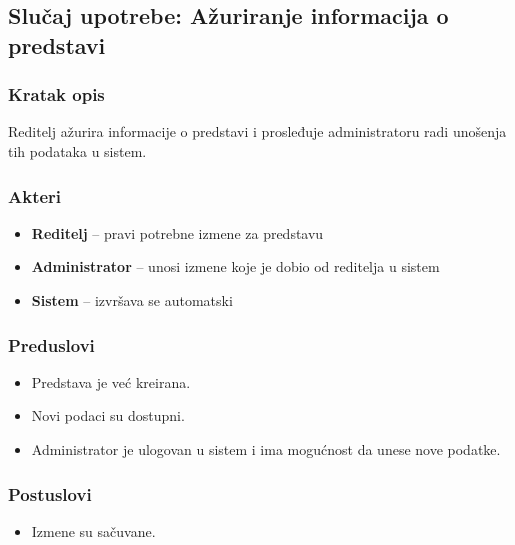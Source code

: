 \subsection{Slučaj upotrebe: Ažuriranje informacija o predstavi}

\subsubsection*{Kratak opis}

Reditelj ažurira informacije o predstavi i prosleđuje administratoru
radi unošenja tih podataka u sistem.

\subsubsection*{Akteri}
\begin{itemize}
    \item \textbf{Reditelj} -- pravi potrebne izmene za predstavu
    \item \textbf{Administrator} -- unosi izmene koje je dobio od reditelja u sistem
    \item \textbf{Sistem} -- izvršava se automatski
\end{itemize}

\subsubsection*{Preduslovi}
\begin{itemize}
    \item Predstava je već kreirana.
    \item Novi podaci su dostupni.
    \item Administrator je ulogovan u sistem i ima mogućnost da unese nove podatke.
\end{itemize}

\subsubsection*{Postuslovi}
\begin{itemize}
    \item Izmene su sačuvane.
\end{itemize}

